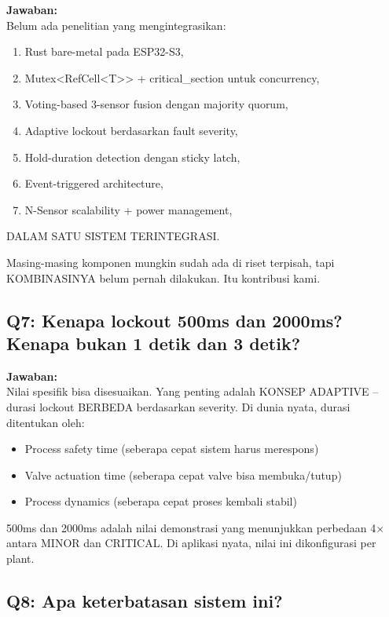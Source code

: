 \documentclass[12pt,a4paper]{article}
\begin{document}
\textbf{Jawaban:}\\
Belum ada penelitian yang mengintegrasikan:
\begin{enumerate}[nosep,label=(\alph*)]
    \item Rust bare-metal pada ESP32-S3,
    \item Mutex<RefCell<T>> + critical\_section untuk concurrency,
    \item Voting-based 3-sensor fusion dengan majority quorum,
    \item Adaptive lockout berdasarkan fault severity,
    \item Hold-duration detection dengan sticky latch,
    \item Event-triggered architecture,
    \item N-Sensor scalability + power management,
\end{enumerate}

DALAM SATU SISTEM TERINTEGRASI.

Masing-masing komponen mungkin sudah ada di riset terpisah, tapi
KOMBINASINYA belum pernah dilakukan. Itu kontribusi kami.

\subsection{Q7: Kenapa lockout 500ms dan 2000ms? Kenapa bukan 1 detik dan 3 detik?}

\textbf{Jawaban:}\\
Nilai spesifik bisa disesuaikan. Yang penting adalah KONSEP ADAPTIVE -- durasi
lockout BERBEDA berdasarkan severity. Di dunia nyata, durasi ditentukan oleh:
\begin{itemize}[nosep]
    \item Process safety time (seberapa cepat sistem harus merespons)
    \item Valve actuation time (seberapa cepat valve bisa membuka/tutup)
    \item Process dynamics (seberapa cepat proses kembali stabil)
\end{itemize}

500ms dan 2000ms adalah nilai demonstrasi yang menunjukkan perbedaan 4$\times$ antara
MINOR dan CRITICAL. Di aplikasi nyata, nilai ini dikonfigurasi per plant.

\subsection{Q8: Apa keterbatasan sistem ini?}
\end{document}
